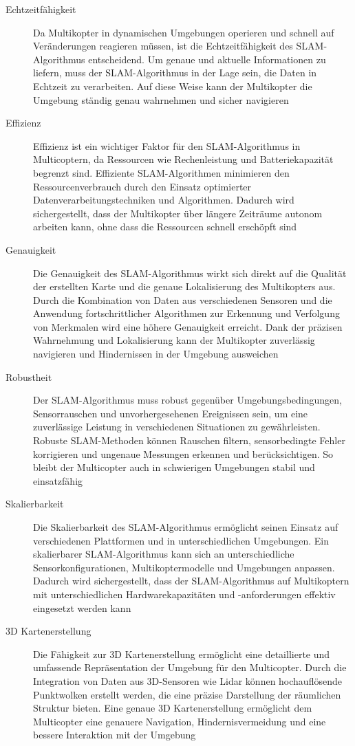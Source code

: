 \begin{description}
    \item[Echtzeitfähigkeit]{Da Multikopter in dynamischen Umgebungen operieren und schnell auf Veränderungen reagieren müssen, ist die Echtzeitfähigkeit des SLAM-Algorithmus entscheidend. Um genaue und aktuelle Informationen zu liefern, muss der SLAM-Algorithmus in der Lage sein, die Daten in Echtzeit zu verarbeiten. Auf diese Weise kann der Multikopter die Umgebung ständig genau wahrnehmen und sicher navigieren}
    \item[Effizienz]{
        Effizienz ist ein wichtiger Faktor für den SLAM-Algorithmus in Multicoptern, da Ressourcen wie Rechenleistung und Batteriekapazität begrenzt sind. Effiziente SLAM-Algorithmen minimieren den Ressourcenverbrauch durch den Einsatz optimierter Datenverarbeitungstechniken und Algorithmen. Dadurch wird sichergestellt, dass der Multikopter über längere Zeiträume autonom arbeiten kann, ohne dass die Ressourcen schnell erschöpft sind
        }
    \item[Genauigkeit]{Die Genauigkeit des SLAM-Algorithmus wirkt sich direkt auf die Qualität der erstellten Karte und die genaue Lokalisierung des Multikopters aus. Durch die Kombination von Daten aus verschiedenen Sensoren und die Anwendung fortschrittlicher Algorithmen zur Erkennung und Verfolgung von Merkmalen wird eine höhere Genauigkeit erreicht. Dank der präzisen Wahrnehmung und Lokalisierung kann der Multikopter zuverlässig navigieren und Hindernissen in der Umgebung ausweichen}
    \item[Robustheit]{Der SLAM-Algorithmus muss robust gegenüber Umgebungsbedingungen, Sensorrauschen und unvorhergesehenen Ereignissen sein, um eine zuverlässige Leistung in verschiedenen Situationen zu gewährleisten. Robuste SLAM-Methoden können Rauschen filtern, sensorbedingte Fehler korrigieren und ungenaue Messungen erkennen und berücksichtigen. So bleibt der Multicopter auch in schwierigen Umgebungen stabil und einsatzfähig}
    \item[Skalierbarkeit]{Die Skalierbarkeit des SLAM-Algorithmus ermöglicht seinen Einsatz auf verschiedenen Plattformen und in unterschiedlichen Umgebungen. Ein skalierbarer SLAM-Algorithmus kann sich an unterschiedliche Sensorkonfigurationen, Multikoptermodelle und Umgebungen anpassen. Dadurch wird sichergestellt, dass der SLAM-Algorithmus auf Multikoptern mit unterschiedlichen Hardwarekapazitäten und -anforderungen effektiv eingesetzt werden kann}
    \item[3D Kartenerstellung]{Die Fähigkeit zur 3D Kartenerstellung ermöglicht eine detaillierte und umfassende Repräsentation der Umgebung für den Multicopter. Durch die Integration von Daten aus 3D-Sensoren wie Lidar können hochauflösende Punktwolken erstellt werden, die eine präzise Darstellung der räumlichen Struktur bieten. Eine genaue 3D Kartenerstellung ermöglicht dem Multicopter eine genauere Navigation, Hindernisvermeidung und eine bessere Interaktion mit der Umgebung} 
\end{description}

